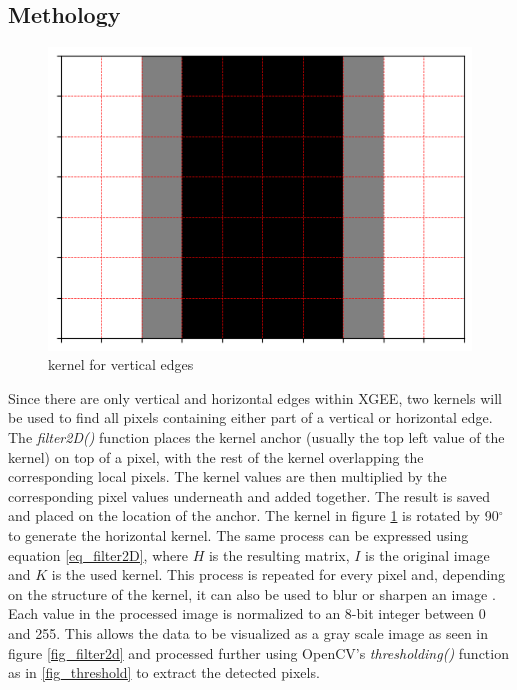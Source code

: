 \subsection{Methology}
\begin{figure}
    \centering
    \includegraphics[width=\linewidth]{Pictures/kernel_ver.png}
    \caption{kernel for vertical edges}
    \label{fig_kernel_ver}
\end{figure}
Since there are only vertical and horizontal edges within XGEE, two kernels will be used to find all pixels containing either part of a vertical or horizontal edge. The \textit{filter2D()} function places the kernel anchor (usually the top left value of the kernel) on top of a pixel, with the rest of the kernel overlapping the corresponding local pixels. The kernel values are then multiplied by the corresponding pixel values underneath and added together. The result is saved and placed on the location of the anchor. The kernel in figure \ref{fig_kernel_ver} is rotated by 90$^{\circ}$ to generate the horizontal kernel. The same process can be expressed using equation \ref{eq_filter2D}, where $H$ is the resulting matrix, $I$ is the original image and $K$ is the used kernel. This process is repeated for every pixel and, depending on the structure of the kernel, it can also be used to blur or sharpen an image \cite{web_filter2D}.\\
Each value in the processed image is normalized to an 8-bit integer between 0 and 255. This allows the data to be visualized as a gray scale image as seen in figure \ref{fig_filter2d} and processed further using OpenCV's \textit{thresholding()} function as in \ref{fig_threshold} to extract the detected pixels.\\
